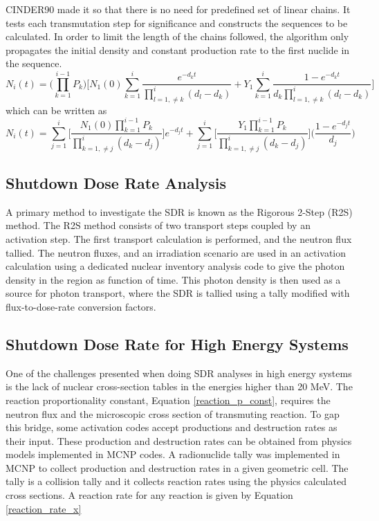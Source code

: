 CINDER90 made it so that there is no need for predefined set
of linear chains. It tests each transmutation step for significance and
constructs the sequences to be calculated. In order to limit the length
of the chains followed, the algorithm only propagates the
initial density and constant production rate to the first nuclide in the sequence.
\begin{equation}\label{eq:bateman_he_1st_n}
  N_{i}(t) =
  \Bigg( \prod_{k=1}^{i-1} P_{k} \Bigg)
  \Bigg[ N_{1}(0) \sum_{k=1}^{i}\frac{e^{-d_{k}t}}{\displaystyle
  \prod_{l=1, \neq k}^{i}(d_{l} -d_{k})}
  + Y_{1}
  \sum_{k=1}^{i} \frac{1 - e^{-d_{k}t}}{d_{k}
  \displaystyle \prod_{l=1, \neq k}^{i}(d_{l} -d_{k})}
  \Bigg]
\end{equation}
which can be written as
\begin{equation}\label{eq:bateman_he_1st_n2}
  N_{i}(t) = \sum_{j=1}^{i}
  \Bigg[ \frac{N_{1}(0) \displaystyle \prod_{k=1}^{i-1} P_{k}}
  {\displaystyle \prod_{k=1, \neq j}^{i}(d_{k} -d_{j})} \Bigg]e^{-d_{j}t} +
  \sum_{j=1}^{i}
  \Bigg [ \frac{Y_{1} \displaystyle \prod_{k=1}^{i-1} P_{k}}
  {\displaystyle \prod_{k=1, \neq j}^{i}(d_{k} -d_{j})} \Bigg]
  \Bigg( \frac{1 - e^{-d_{j}t}}{d_{j}} \Bigg)
\end{equation}


\subsection{Shutdown Dose Rate Analysis}

A primary method to investigate the SDR is known as the
Rigorous 2-Step (R2S) method. The R2S method consists of two transport steps
coupled by an activation step. 
The first transport calculation is performed, and the neutron flux tallied.
The neutron fluxes, and an irradiation scenario are used in an activation
calculation using a dedicated nuclear inventory analysis code to give the 
photon density in the region as function of time. 
This photon density is then used as a source for photon transport,
where the SDR is tallied using a tally modified with flux-to-dose-rate
conversion factors.

\subsection{Shutdown Dose Rate for High Energy Systems}
One of the challenges presented when doing SDR analyses in high energy systems is the 
lack of nuclear cross-section tables in the energies higher than 20 MeV. 
The reaction proportionality constant, Equation \ref{reaction_p_const},
requires the neutron flux and the microscopic cross section of transmuting reaction.
To gap this bridge, some activation codes accept productions and destruction rates
as their input. These production and destruction rates can be obtained from
physics models implemented in MCNP codes.
A radionuclide tally was implemented in MCNP to collect production and destruction
rates in a given geometric cell. The tally is a collision tally and
it collects reaction rates using the physics calculated
cross sections. A reaction rate for any reaction is given by Equation
\ref{reaction_rate_x}

